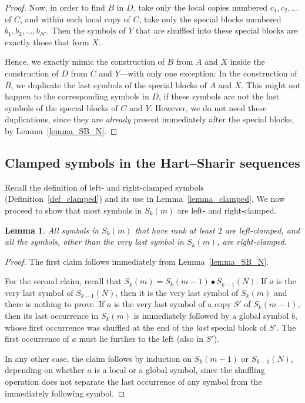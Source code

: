 \documentclass[11pt]{article}
\newtheorem{lemma}[theorem]{Lemma}
\theoremstyle{definition}
\theoremstyle{remark}
\begin{document}
\begin{proof}
Now, in order to find $B$ in $D$, take only the local copies numbered $c_1, c_2, \ldots$ of $C$, and within each local copy of $C$, take only the special blocks numbered $b_1, b_2, \ldots, b_{N'}$. Then the symbols of $Y$ that are shuffled into these special blocks are exactly those that form $X$.

Hence, we exactly mimic the construction of $B$ from $A$ and $X$ inside the construction of $D$ from $C$ and $Y$---with only one exception: In the construction of $B$, we duplicate the last symbols of the special blocks of $A$ and $X$. This might not happen to the corresponding symbols in $D$, if these symbols are not the last symbols of the special blocks of $C$ and $Y$. However, we do not need these duplications, since they are \emph{already} present immediately after the special blocks, by Lemma~\ref{lemma_SB_N}.
\end{proof}

\subsection{Clamped symbols in the Hart--Sharir sequences}

Recall the definition of left- and right-clamped symbols (Definition~\ref{def_clamped}) and its use in Lemma~\ref{lemma_clamped}. We now proceed to show that most symbols in $S_k(m)$ are left- and right-clamped.

\begin{lemma}\label{lem_leader}
All symbols in $S_k(m)$ that have rank at least $2$ are left-clamped, and all the symbols, other than the very last symbol in $S_k(m)$, are right-clamped.
\end{lemma}

\begin{proof}
The first claim follows immediately from Lemma~\ref{lemma_SB_N}.

For the second claim, recall that $S_k(m) = S_k(m-1)\bullet S_{k-1}(N)$. If $a$ is the very last symbol of $S_{k-1}(N)$, then it is the very last symbol of $S_k(m)$ and there is nothing to prove. If $a$ is the very last symbol of a copy $S'$ of $S_k(m-1)$, then its last occurrence in $S_k(m)$ is immediately followed by a global symbol $b$, whose first occurrence was shuffled at the end of the \emph{last} special block of $S'$. The first occurrence of $a$ must lie further to the left (also in $S'$).

In any other case, the claim follows by induction on $S_k(m-1)$ or $S_{k-1}(N)$, depending on whether $a$ is a local or a global symbol, since the shuffling operation does not separate the last occurrence of any symbol from the immediately following symbol.
\end{proof}
\end{document}
